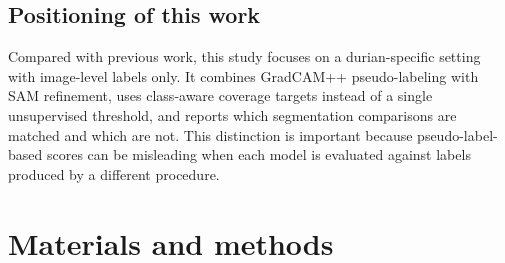 \documentclass[final,5p,times,twocolumn,authoryear]{elsarticle}
\begin{document}
\subsection{Positioning of this work}

Compared with previous work, this study focuses on a durian-specific setting with image-level labels only. It combines GradCAM++ pseudo-labeling with SAM refinement, uses class-aware coverage targets instead of a single unsupervised threshold, and reports which segmentation comparisons are matched and which are not. This distinction is important because pseudo-label-based scores can be misleading when each model is evaluated against labels produced by a different procedure.

\section{Materials and methods}
\label{sec:method}
\end{document}
